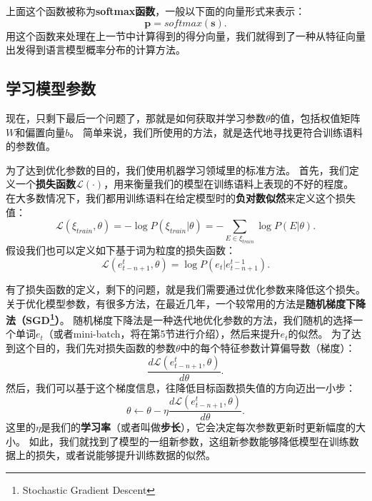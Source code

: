 \documentclass[10pt,a4paper]{ctexart}
\begin{document}
上面这个函数被称为\textbf{softmax函数}，一般以下面的向量形式来表示：
\begin{equation}\label{eq:20}
 \textbf{p} = softmax(\textbf{s}).
\end{equation}
用这个函数来处理在上一节中计算得到的得分向量，我们就得到了一种从特征向量出发得到语言模型概率分布的计算方法。

\subsection{学习模型参数}
现在，只剩下最后一个问题了，那就是如何获取并学习参数$\theta$的值，包括权值矩阵$W$和偏置向量$b$。
简单来说，我们所使用的方法，就是迭代地寻找更符合训练语料的参数值。

为了达到优化参数的目的，我们使用机器学习领域里的标准方法。
首先，我们定义一个\textbf{损失函数}$\mathcal{L}(\cdot)$，用来衡量我们的模型在训练语料上表现的不好的程度。
在大多数情况下，我们都用训练语料在给定模型时的\textbf{负对数似然}来定义这个损失值：
\begin{equation}\label{eq:21}
 \mathcal{L}( \xi_{train},\theta ) = - \log P(\xi_{train} | \theta ) = - \sum_{E \in \xi_{train}} \log P(E |\theta).
\end{equation}
假设我们也可以定义如下基于词为粒度的损失函数：
\begin{equation}\label{eq:22}
 \mathcal{L}(e_{t-n+1}^{t},\theta) = \log P(e_t | e_{t-n+1}^{t-1}).
\end{equation}

有了损失函数的定义，剩下的问题，就是我们需要通过优化参数来降低这个损失。
关于优化模型参数，有很多方法，在最近几年，一个较常用的方法是\textbf{随机梯度下降法（SGD\footnote{Stochastic Gradient Descent}）}。
随机梯度下降法是一种迭代地优化参数的方法，我们随机的选择一个单词$e_t$（或者mini-batch，将在第5节进行介绍），然后来提升$e_t$的似然。
为了达到这个目的，我们先对损失函数的参数$\theta$中的每个特征参数计算偏导数（梯度）：
\begin{equation}\label{eq:23}
 \frac{d\mathcal{L}(e_{t-n+1}^{t},\theta)}{d\theta}.
\end{equation}
然后，我们可以基于这个梯度信息，往降低目标函数损失值的方向迈出一小步：
\begin{equation}\label{eq:24}
 \theta \leftarrow \theta - \eta \frac{d\mathcal{L}(e_{t-n+1}^{t},\theta)}{d\theta}.
\end{equation}
这里的$\eta$是我们的\textbf{学习率}（或者叫做\textbf{步长}），它会决定每次参数更新时更新幅度的大小。
如此，我们就找到了模型的一组新参数，这组新参数能够降低模型在训练数据上的损失，或者说能够提升训练数据的似然。
\end{document}
